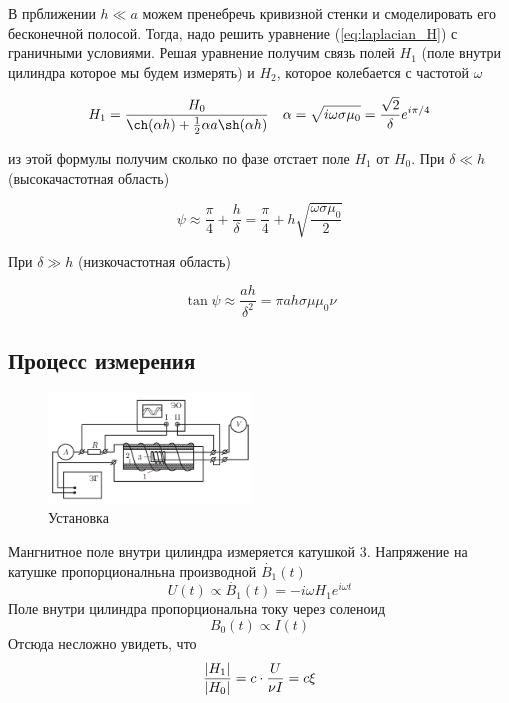 \documentclass{article}
\begin{document}
В прближении $h \ll a$ можем пренебречь кривизной стенки и смоделировать 
его бесконечной полосой. Тогда, надо решить уравнение (\ref{eq:laplacian_H})
с граничными условиями. Решая уравнение получим связь полей $H_1$ 
(поле внутри цилиндра которое мы будем измерять) и $H_2$, которое колебается с частотой
$\omega$

\begin{equation}
    H_1 = \frac{H_0}{\ch(\alpha h) + \frac{1}{2} \alpha a \sh(\alpha h)} 
    \text{\ \ \ }
    \alpha = \sqrt{i\omega \sigma \mu_0} = \frac{\sqrt{2}}{\delta}e^{i\pi/4}
    \label{eq:svyaz_poley}
\end{equation}

из этой формулы получим сколько по фазе отстает поле $H_1$ от $H_0$. При $\delta \ll h$
(высокачастотная область)

\begin{equation}
    \psi \approx \frac{\pi}{4} + \frac{h}{\delta} = 
    \frac{\pi}{4} + h \sqrt{\frac{\omega \sigma \mu_0}{2}}
    \label{eq:faza_high_freq}
\end{equation}

При $\delta \gg h$ (низкочастотная область)

\begin{equation}
    \tan \psi \approx \frac{ah}{\delta^2} = \pi a h \sigma \mu \mu_0 \nu
    \label{eq:faza_low_freq}
\end{equation}
\newpage

\subsection{Процесс измерения}
\begin{figure}
  \begin{center}
    \includegraphics[width=0.48\textwidth]{ustanovka}
  \end{center}
  \caption{Установка}\label{fig:ustanovka}
\end{figure}

Мангнитное поле внутри цилиндра измеряется катушкой 3. Напряжение на катушке
пропорционалньна производной $\dot{B_1}(t)$
\begin{equation*}
    U(t) \propto \dot{B_1}(t) = -i\omega H_1 e^{i\omega t}
\end{equation*}
Поле внутри цилиндра пропорциональна току через соленоид
\begin{equation*}
    B_0(t) \propto I(t)
\end{equation*}
Отсюда несложно увидеть, что
\begin{equation}
    \frac{\abs{H_1}}{\abs{H_0}} = c \cdot \frac{U}{\nu I} = c \xi
    \label{eq:otnoshenie_amplitud}
\end{equation}
\vspace{0.3cm}
\end{document}
